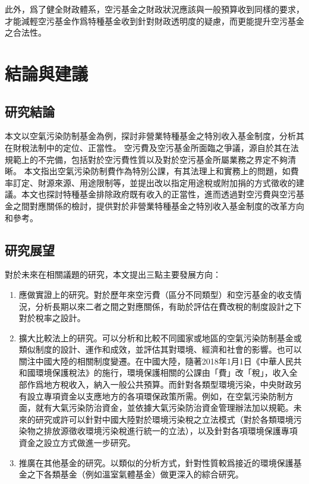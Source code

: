 \documentclass[12pt,a4paper]{article}
\begin{document}
此外，爲了健全財政體系，空污基金之財政狀況應該與一般預算收到同樣的要求，才能減輕空污基金作爲特種基金收到針對財政透明度的疑慮，而更能提升空污基金之合法性。

\section{結論與建議}

\subsection{研究結論}

本文以空氣污染防制基金為例，探討非營業特種基金之特別收入基金制度，分析其在財稅法制中的定位、正當性。
空污費及空污基金所面臨之爭議，源自於其在法規範上的不完備，包括對於空污費性質以及對於空污基金所屬業務之界定不夠清晰。
本文指出空氣污染防制費作為特別公課，有其法理上和實務上的問題，如費率訂定、財源來源、用途限制等，並提出改以指定用途稅或附加捐的方式徵收的建議。本文也探討特種基金排除政府既有收入的正當性，進而透過對空污費與空污基金之間對應關係的檢討，提供對於非營業特種基金之特別收入基金制度的改革方向和參考。



\subsection{研究展望}

對於未來在相關議題的研究，本文提出三點主要發展方向：
\begin{enumerate}
  \item 應做實證上的研究。對於歷年來空污費（區分不同類型）和空污基金的收支情況，分析長期以來二者之間之對應關係，有助於評估在費改稅的制度設計之下對於稅率之設計。
  \item 擴大比較法上的研究。可以分析和比較不同國家或地區的空氣污染防制基金或類似制度的設計、運作和成效，並評估其對環境、經濟和社會的影響。也可以關注中國大陸的相關制度變遷。在中國大陸，隨著2018年1月1日《中華人民共和國環境保護稅法》的施行，環境保護相關的公課由「費」改「稅」，收入全部作爲地方稅收入，納入一般公共預算。而針對各類型環境污染，中央財政另有設立專項資金以支應地方的各項環保政策所需。例如，在空氣污染防制方面，就有大氣污染防治資金，並依據大氣污染防治資金管理辦法加以規範。未來的研究或許可以針對中國大陸對於環境污染稅之立法模式（對於各類環境污染物之排放源徵收環境污染稅進行統一的立法），以及針對各項環境保護專項資金之設立方式做進一步研究。
  \item 推廣在其他基金的研究。以類似的分析方式，針對性質較爲接近的環境保護基金之下各類基金（例如溫室氣體基金）做更深入的綜合研究。
\end{enumerate}
\end{document}
